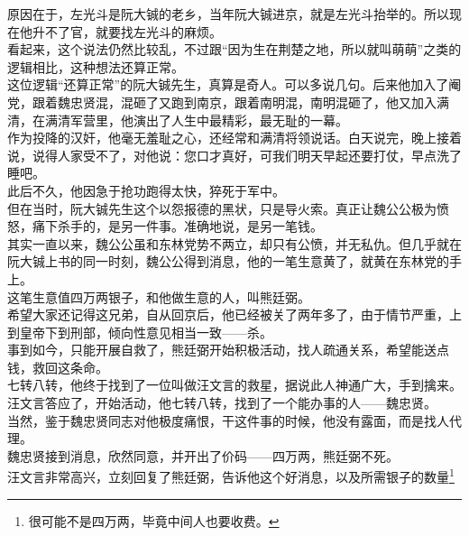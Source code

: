 \begin{multicols}{\theparacolNo}
原因在于，左光斗是阮大铖的老乡，当年阮大铖进京，就是左光斗抬举的。所以现在他升不了官，就要找左光斗的麻烦。\\

看起来，这个说法仍然比较乱，不过跟“因为生在荆楚之地，所以就叫萌萌”之类的逻辑相比，这种想法还算正常。\\

这位逻辑“还算正常”的阮大铖先生，真算是奇人。可以多说几句。后来他加入了阉党，跟着魏忠贤混，混砸了又跑到南京，跟着南明混，南明混砸了，他又加入满清，在满清军营里，他演出了人生中最精彩，最无耻的一幕。\\

作为投降的汉奸，他毫无羞耻之心，还经常和满清将领说话。白天说完，晚上接着说，说得人家受不了，对他说：您口才真好，可我们明天早起还要打仗，早点洗了睡吧。\\

此后不久，他因急于抢功跑得太快，猝死于军中。\\

但在当时，阮大铖先生这个以怨报德的黑状，只是导火索。真正让魏公公极为愤怒，痛下杀手的，是另一件事。准确地说，是另一笔钱。\\

其实一直以来，魏公公虽和东林党势不两立，却只有公愤，并无私仇。但几乎就在阮大铖上书的同一时刻，魏公公得到消息，他的一笔生意黄了，就黄在东林党的手上。\\

这笔生意值四万两银子，和他做生意的人，叫熊廷弼。\\

希望大家还记得这兄弟，自从回京后，他已经被关了两年多了，由于情节严重，上到皇帝下到刑部，倾向性意见相当一致——杀。\\

事到如今，只能开展自救了，熊廷弼开始积极活动，找人疏通关系，希望能送点钱，救回这条命。\\

七转八转，他终于找到了一位叫做汪文言的救星，据说此人神通广大，手到擒来。\\

汪文言答应了，开始活动，他七转八转，找到了一个能办事的人——魏忠贤。\\

当然，鉴于魏忠贤同志对他极度痛恨，干这件事的时候，他没有露面，而是找人代理。\\

魏忠贤接到消息，欣然同意，并开出了价码——四万两，熊廷弼不死。\\

汪文言非常高兴，立刻回复了熊廷弼，告诉他这个好消息，以及所需银子的数量\footnote{很可能不是四万两，毕竟中间人也要收费。}\\


\end{multicols}

